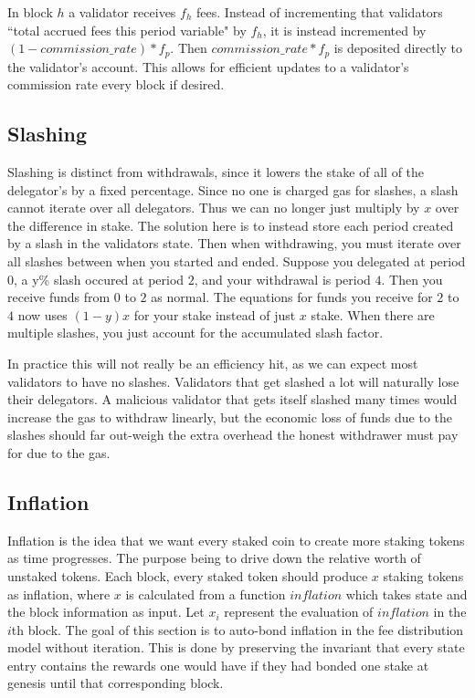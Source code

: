 \documentclass[]{article}
\begin{document}
In block $h$ a validator receives $f_h$ fees.
Instead of incrementing that validators ``total accrued fees this period variable" by $f_h$, it is instead incremented by $(1 - commission\_rate) * f_p$.
Then $commission\_rate * f_p$ is deposited directly to the validator's account.
This allows for efficient updates to a validator's commission rate every block if desired.

\subsection{Slashing}
\label{ssec:slashing}
Slashing is distinct from withdrawals, since it lowers the stake of all of the delegator's by a fixed percentage.
Since no one is charged gas for slashes, a slash cannot iterate over all delegators.
Thus we can no longer just multiply by $x$ over the difference in stake. 
The solution here is to instead store each period created by a slash in the validators state.
Then when withdrawing, you must iterate over all slashes between when you started and ended.
Suppose you delegated at period $0$, a y\% slash occured at period $2$, and your withdrawal is period $4$.
Then you receive funds from $0$ to $2$ as normal.
The equations for funds you receive for $2$ to $4$ now uses $(1 - y)x$ for your stake instead of just $x$ stake.
When there are multiple slashes, you just account for the accumulated slash factor.

In practice this will not really be an efficiency hit, as we can expect most validators to have no slashes.
Validators that get slashed a lot will naturally lose their delegators.
A malicious validator that gets itself slashed many times would increase the gas to withdraw linearly, but the economic loss of funds due to the slashes should far out-weigh the extra overhead the honest withdrawer must pay for due to the gas.

\subsection{Inflation}
Inflation is the idea that we want every staked coin to create more staking tokens as time progresses.
The purpose being to drive down the relative worth of unstaked tokens.
Each block, every staked token should produce $x$ staking tokens as inflation, where $x$ is calculated from a function $inflation$ which takes state and the block information as input.
Let $x_i$ represent the evaluation of $inflation$ in the $i$th block.
The goal of this section is to auto-bond inflation in the fee distribution model without iteration.
This is done by preserving the invariant that every state entry contains the rewards one would have if they had bonded one stake at genesis until that corresponding block.
\end{document}
